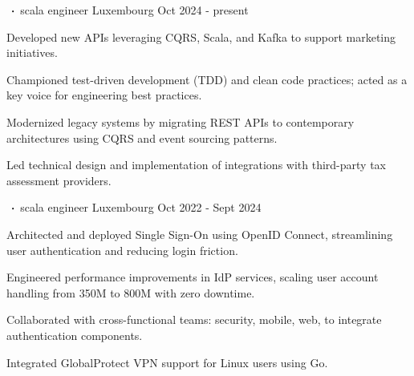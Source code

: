 \begin{cventries}
    \cventry
    {     }
    {$\sqbig$scala engineer}
    {Luxembourg}
    {Oct 2024 - present}
    {}
    {
        \begin{cvitems}
            \item{Developed new APIs leveraging CQRS, Scala, and Kafka to support marketing initiatives.}
            \item{Championed test-driven development (TDD) and clean code practices; acted as a key voice for engineering best practices.}
            \item{Modernized legacy systems by migrating REST APIs to contemporary architectures using CQRS and event sourcing patterns.}
            \item{Led technical design and implementation of integrations with third-party tax assessment providers.}
        \end{cvitems}
    }



    \cventry
    {       }
    {$\sqbig$scala engineer}
    {Luxembourg}
    {Oct 2022 - Sept 2024}
    {}
    {
        \begin{cvitems}
            \item{Architected and deployed Single Sign-On using OpenID Connect, streamlining user authentication and reducing login friction.}
            \item{Engineered performance improvements in IdP services, scaling user account handling from 350M to 800M with zero downtime.}
            \item{Collaborated with cross-functional teams: security, mobile, web, to integrate authentication components.}
            \item{Integrated GlobalProtect VPN support for Linux users using Go.}
        \end{cvitems}
    }


\end{cventries}
